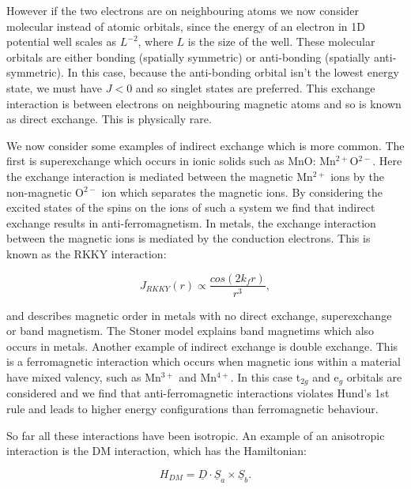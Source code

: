\noindent However if the two electrons are on neighbouring atoms we now consider molecular instead of atomic orbitals, since the energy of an electron in 1D potential well scales as $L^{-2}$, where $L$ is the size of the well. These molecular orbitals are either bonding (spatially symmetric) or anti-bonding (spatially anti-symmetric). In this case, because the anti-bonding orbital isn't the lowest energy state, we must have $J<0$ and so singlet states are preferred. This exchange interaction is between electrons on neighbouring magnetic atoms and so is known as direct exchange. This is physically rare.

\noindent We now consider some examples of indirect exchange which is more common.
The first is superexchange which occurs in ionic solids such as MnO: Mn$^{2+}$O$^{2-}$. Here the exchange interaction is mediated between the magnetic Mn$^{2+}$ ions by the non-magnetic O$^{2-}$ ion which separates the magnetic ions. By considering the excited states of the spins on the ions of such a system we find that indirect exchange results in anti-ferromagnetism.
In metals, the exchange interaction between the magnetic ions is mediated by the conduction electrons. This is known as the RKKY interaction:

\begin{equation}
    J_{RKKY}(r) \propto \frac{cos(2k_fr)}{r^3},
    \label{IndirectInteractionRKKY}
\end{equation}

\noindent and describes magnetic order in metals with no direct exchange, superexchange or band magnetism. The Stoner model explains band magnetims which also occurs in metals.
Another example of indirect exchange is double exchange. This is a ferromagnetic interaction which occurs when magnetic ions within a material have mixed valency, such as Mn$^{3+}$ and Mn$^{4+}$. In this case t$_{2g}$ and e$_g$ orbitals are considered and we find that anti-ferromagnetic interactions violates Hund's 1st rule and leads to higher energy configurations than ferromagnetic behaviour.

\noindent So far all these interactions have been isotropic. An example  of an anisotropic interaction is the DM interaction, which has the Hamiltonian:

\begin{equation}
    H_{DM} = \underline{D} \cdot \underline{S}_a \times \underline{S}_b.
    \label{AnisotropicInteractionDM}
\end{equation}

